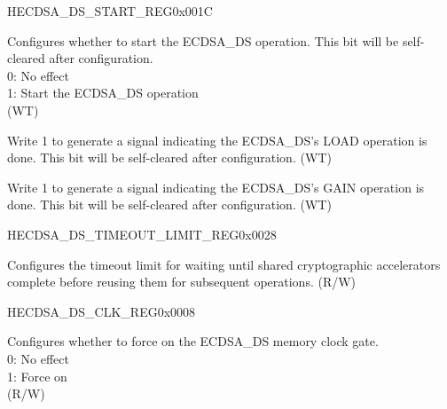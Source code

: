 \begin{register}{H}{ECDSA\_DS\_START\_REG}{0x001C}\label{regdesc:ECDSADSSTARTREG}
%
%
%
%
\regnewline%
\begin{regdesc}\begin{reglist}
\label{fielddesc:ECDSADSSTART}\item [ECDSA\_DS\_START] Configures whether to start the ECDSA\_DS operation. This bit will be self-cleared after configuration. \\
0: No effect\\
1: Start the ECDSA\_DS operation\\
(WT)
\label{fielddesc:ECDSADSLOADDONE}\item [ECDSA\_DS\_LOAD\_DONE] Write 1 to generate a signal indicating the ECDSA\_DS's LOAD operation is done. This bit will be self-cleared after configuration. (WT)
\label{fielddesc:ECDSADSGETDONE}\item [ECDSA\_DS\_GET\_DONE] Write 1 to generate a signal indicating the ECDSA\_DS's GAIN operation is done. This bit will be self-cleared after configuration. (WT)
\end{reglist}\end{regdesc}
\end{register}


\begin{register}{H}{ECDSA\_DS\_TIMEOUT\_LIMIT\_REG}{0x0028}\label{regdesc:ECDSADSTIMEOUTLIMITREG}
%
\regnewline%
\begin{regdesc}\begin{reglist}
\label{fielddesc:ECDSADSTIMEOUTLIMIT}\item [ECDSA\_DS\_TIMEOUT\_LIMIT] Configures the timeout limit for waiting until shared cryptographic accelerators complete before reusing them for subsequent operations. (R/W)
\end{reglist}\end{regdesc}
\end{register}


\begin{register}{H}{ECDSA\_DS\_CLK\_REG}{0x0008}\label{regdesc:ECDSADSCLKREG}
%
%
\regnewline%
\begin{regdesc}\begin{reglist}
\label{fielddesc:ECDSADSCLKGATEFORCEON}\item [ECDSA\_DS\_CLK\_GATE\_FORCE\_ON] Configures whether to force on the ECDSA\_DS memory clock gate. \\
0: No effect\\
1: Force on\\
(R/W)
\end{reglist}\end{regdesc}
\end{register}


